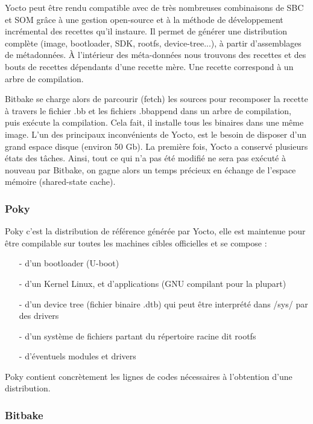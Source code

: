 Yocto peut être rendu compatible avec de très nombreuses combinaisons de SBC et SOM
grâce à une gestion open-source et à la méthode de développement incrémental des
recettes qu’il instaure. Il permet de générer une distribution complète (image, bootloader,
SDK, rootfs, device-tree...), à partir d’assemblages de métadonnées. À l’intérieur des
méta-données nous trouvons des recettes et des bouts de recettes dépendants d’une
recette mère. Une recette correspond à un arbre de compilation. \medskip

Bitbake se charge alors de parcourir (fetch) les sources pour recomposer la recette à travers le 
fichier .bb et les fichiers .bbappend dans un arbre de compilation, puis exécute la compilation.
Cela fait,  il installe tous les binaires dans une même image. L’un des principaux inconvénients de
Yocto, est le besoin de disposer d’un grand espace disque (environ 50 Gb). La première fois, Yocto
a conservé  plusieurs états des tâches. Ainsi, tout ce qui n’a pas été modifié ne sera pas exécuté
à nouveau par Bitbake, on gagne alors un temps précieux en échange de l’espace mémoire
(shared-state cache).

\subsubsection{Poky}

Poky c'est la distribution de référence générée par Yocto, elle est maintenue pour être
compilable sur toutes les machines cibles officielles et se compose :

\begin{itemize}
    \item[-] d'un bootloader (U-boot)
    \item[-] d’un Kernel Linux, et d’applications (GNU compilant pour la plupart)
    \item[-] d’un device tree (fichier binaire .dtb) qui peut être interprété dans /sys/ par des
    drivers
    \item[-] d’un système de fichiers partant du répertoire racine dit rootfs
    \item[-] d’éventuels modules et drivers
\end{itemize}

Poky contient concrètement les lignes de codes nécessaires à l'obtention d'une distribution.

\subsubsection{Bitbake}

